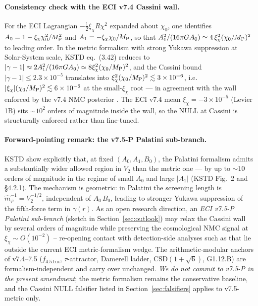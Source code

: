\documentclass[a4paper,11pt]{article}
\newcommand{\fLM}{f_{\text{4.5.b.a}}}
\theoremstyle{definition}
\theoremstyle{remark}
\begin{document}
\paragraph{Consistency check with the ECI v7.4 Cassini wall.}
For the ECI Lagrangian $-\tfrac{1}{2}\xi_\chi R\chi^2$ expanded
about $\chi_0$, one identifies $A_0 = 1 - \xi_\chi\chi_0^2/M_{\rm P}^2$
and $A_1 = -\xi_\chi\chi_0/M_{\rm P}$, so that
$A_1^2/(16\pi G A_0) \simeq 4\,\xi_\chi^2(\chi_0/M_{\rm P})^2$
to leading order.  In the metric formalism with strong Yukawa
suppression at Solar-System scale, KSTD eq.~(3.42) reduces to
$|\gamma-1| \approx 2A_1^2/(16\pi G A_0) \simeq 8\xi_\chi^2(\chi_0/M_{\rm P})^2$,
and the Cassini bound $|\gamma-1|\le 2.3\times 10^{-5}$ translates
into $\xi_\chi^2(\chi_0/M_{\rm P})^2 \lesssim 3\times 10^{-6}$, i.e.\
$|\xi_\chi|(\chi_0/M_{\rm P})^2 \lesssim 6\times 10^{-6}$ at the
small-$\xi_\chi$ root --- in agreement with the wall enforced by
the v7.4 NMC posterior \cite[App.~A]{Wolf25}.  The ECI v7.4 mean
$\xi_\chi = -3\times 10^{-5}$ (Levier 1B) sits $\sim 10^{2}$ orders
of magnitude inside the wall, so the NULL at Cassini is
structurally enforced rather than fine-tuned.

\paragraph{Forward-pointing remark: the v7.5-P Palatini sub-branch.}
KSTD show explicitly that, at fixed $(A_0,A_1,B_0)$, the Palatini
formalism admits a substantially wider allowed region in $V_2$
than the metric one --- by up to $\sim 10$ orders of magnitude in
the regime of small $A_0$ and large $|A_1|$ (KSTD Fig.~2 and
\S 4.2.1).  The mechanism is geometric: in Palatini the screening
length is $\hat m_\varphi^{-1} = V_2^{-1/2}$, independent of
$A_0\,B_0$, leading to stronger Yukawa suppression of the
fifth-force term in $\gamma(r)$.  As an open research direction,
an \emph{ECI v7.5-P Palatini sub-branch} (sketch in
Section~\ref{sec:outlook}) may relax the Cassini wall by several
orders of magnitude while preserving the cosmological NMC signal
at $\xi_\chi\sim O(10^{-2})$ -- re-opening contact with
detection-side analyses such as \cite{Wolf25} that lie outside
the current ECI metric-formalism wedge.  The arithmetic-modular
anchors of v7.4--7.5 ($\fLM$, $\tau$-attractor, Damerell ladder,
CSD$(1+\sqrt 6)$, G1.12.B) are formalism-independent and carry
over unchanged.  \emph{We do not commit to v7.5-P in the present
amendment}; the metric formalism remains the conservative
baseline, and the Cassini NULL falsifier listed in
Section~\ref{sec:falsifiers} applies to v7.5-metric only.
\end{document}
